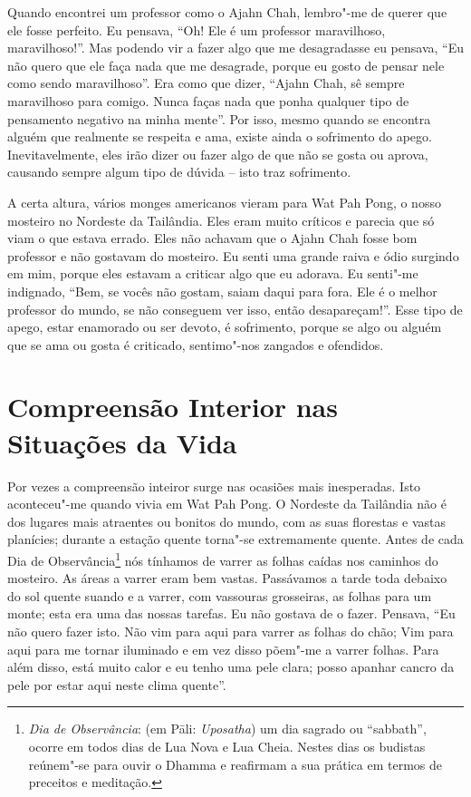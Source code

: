 Quando encontrei um professor como o Ajahn Chah, lembro"-me de querer que ele
fosse perfeito. Eu pensava, “Oh! Ele é um professor maravilhoso, maravilhoso!”.
Mas podendo vir a fazer algo que me desagradasse eu pensava, “Eu não quero que
ele faça nada que me desagrade, porque eu gosto de pensar nele como sendo
maravilhoso”. Era como que dizer, “Ajahn Chah, sê sempre maravilhoso para
comigo. Nunca faças nada que ponha qualquer tipo de pensamento negativo na minha
mente”. Por isso, mesmo quando se encontra alguém que realmente se respeita e
ama, existe ainda o sofrimento do apego. Inevitavelmente, eles irão dizer ou 
fazer algo de que não se gosta ou aprova, causando sempre algum tipo de dúvida 
– isto traz sofrimento.

A certa altura, vários monges americanos vieram para Wat Pah Pong, o nosso
mosteiro no Nordeste da Tailândia. Eles eram muito críticos e parecia que só
viam o que estava errado. Eles não achavam que o Ajahn Chah fosse bom professor
e não gostavam do mosteiro. Eu senti uma grande raiva e ódio surgindo em mim,
porque eles estavam a criticar algo que eu adorava. Eu senti"-me indignado, “Bem,
se vocês não gostam, saiam daqui para fora. Ele é o melhor professor do mundo,
se não conseguem ver isso, então desapareçam!”. Esse tipo de apego, estar
enamorado ou ser devoto, é sofrimento, porque se algo ou alguém que se ama ou
gosta é criticado, sentimo"-nos zangados e ofendidos.

\section{Compreensão Interior nas Situações da Vida}

\enlargethispage*{\baselineskip}

Por vezes a compreensão inteiror surge nas ocasiões mais inesperadas. Isto aconteceu"-me
quando vivia em Wat Pah Pong. O Nordeste da Tailândia não é dos lugares mais
atraentes ou bonitos do mundo, com as suas florestas e vastas planícies; durante
a estação quente torna"-se extremamente quente. Antes de cada Dia de
Observância\footnote{%
  \emph{Dia de Observância}: (em Pāli: \emph{Uposatha}) um dia sagrado ou
  “sabbath”, ocorre em todos dias de Lua Nova e Lua Cheia. Nestes dias os
  budistas reúnem"-se para ouvir o Dhamma e reafirmam a sua prática em termos de
  preceitos e meditação.} nós tínhamos de varrer as folhas caídas nos caminhos
do mosteiro. As áreas a varrer eram bem vastas. Passávamos a tarde toda debaixo
do sol quente suando e a varrer, com vassouras grosseiras, as folhas para um
monte; esta era uma das nossas tarefas. Eu não gostava de o fazer. Pensava, “Eu
não quero fazer isto. Não vim para aqui para varrer as folhas do chão; Vim para
aqui para me tornar iluminado e em vez disso põem"-me a varrer folhas. Para além
disso, está muito calor e eu tenho uma pele clara; posso apanhar cancro da pele
por estar aqui neste clima quente”.


